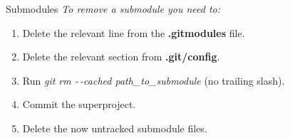 \begin{frame}[fragile]{Submodules}
    \emph{To remove a submodule you need to:}
    \vspace{1cm}

    \begin{enumerate}
        \item Delete the relevant line from the \textbf{.gitmodules} file.
        \item Delete the relevant section from \textbf{.git/config}.
        \item Run \textit{git rm -\,-cached path\_to\_submodule} (no trailing slash).
        \item Commit the superproject.
        \item Delete the now untracked submodule files.
    \end{enumerate}
\end{frame}
